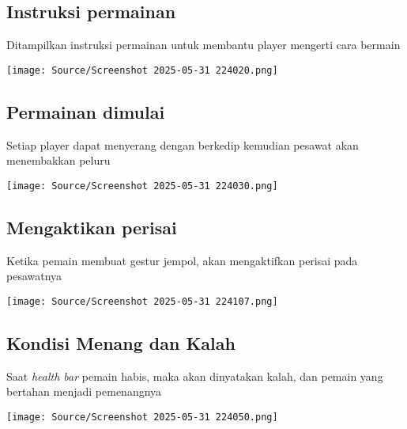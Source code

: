 \documentclass[11pt,a4paper]{article}
\begin{document}
\subsection{Instruksi permainan}
Ditampilkan instruksi permainan untuk membantu player mengerti cara bermain
\begin{center}
	\texttt{[image: Source/Screenshot 2025-05-31 224020.png]}
\end{center}

\subsection{Permainan dimulai}
Setiap player dapat menyerang dengan berkedip kemudian pesawat akan menembakkan peluru
\begin{center}
	\texttt{[image: Source/Screenshot 2025-05-31 224030.png]}
\end{center}

\subsection{Mengaktikan perisai}
Ketika pemain membuat gestur jempol, akan mengaktifkan perisai pada pesawatnya
\begin{center}
	\texttt{[image: Source/Screenshot 2025-05-31 224107.png]}
\end{center}

\subsection{Kondisi Menang dan Kalah}
Saat \textit{health bar} pemain habis, maka akan dinyatakan kalah, dan pemain yang bertahan menjadi pemenangnya
\begin{center}
	\texttt{[image: Source/Screenshot 2025-05-31 224050.png]}
\end{center}

\newpage
\nocite{*}


\end{document}
